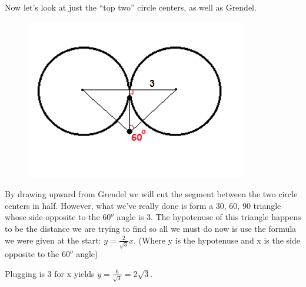 Now let's look at just the ``top two'' circle centers, as well as Grendel.

\begin{figure}[h!]
\centering
\includegraphics[scale=.5]{assets/josh/circletri}
\end{figure}

By drawing upward from Grendel we will cut the segment between the two circle centers in half. However, what we've really done is form a 30, 60, 90 triangle whose side opposite to the $60^o$ angle is 3. The hypotenuse of this triangle happens to be the distance we are trying to find so all we must do now is use the formula we were given at the start: $y = \frac{2}{\sqrt{3}}x$. (Where y is the hypotenuse and x is the side opposite to the $60^o$ angle)

Plugging is 3 for x yields $y= \frac{6}{\sqrt{3}}=2\sqrt{3}$.
